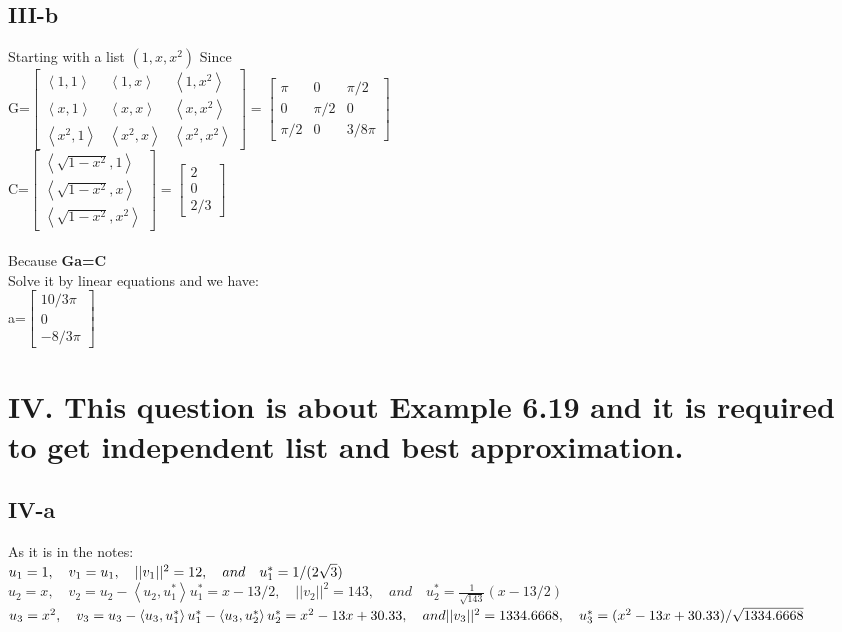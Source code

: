 \documentclass[twoside,a4paper]{article}
\begin{document}
\subsection*{III-b}
Starting with a list $(1,x,x^2)$
Since \\G=$
\begin{bmatrix}
\left< 1,1 \right> & \left< 1,x \right> &\left< 1,x^2 \right>\\
\left< x,1 \right> & \left< x,x \right> & \left< x,x^2 \right> \\
\left< x^2,1 \right> & \left<x^2,x \right> & \left<x^2,x^2 \right>
\end{bmatrix}
=
\begin{bmatrix}
\pi & 0&\pi/2\\
0 & \pi/2 & 0 \\
\pi/2 & 0 & 3/8 \pi
\end{bmatrix}$\\
C=$
\begin{bmatrix}
\left< \sqrt{1-x^2},1 \right> \\
\left< \sqrt{1-x^2},x \right> \\
\left< \sqrt{1-x^2},x^2 \right>
\end{bmatrix}
=
\begin{bmatrix}
2\\
0\\
2/3
\end{bmatrix}
$\\
\\
Because \textbf{Ga=C}\\
Solve it by linear equations and we have:\\
a=$
\begin{bmatrix}
10/3 \pi\\
0\\
-8/3 \pi
\end{bmatrix}
$

\section*{IV. This question is about Example 6.19 and it is required to get independent list and best approximation.}
\subsection*{IV-a}
As it is in the notes:\\
$ u_1=1, \quad v_1=u_1, \quad ||v_1||^2=12, \quad and \quad u^{*}_1=1/(2 \sqrt{3})\\$
$ u_2=x, \quad v_2=u_2- \left<u_2,u^{*}_1 \right> u^{*}_1=x-13/2, \quad ||v_2||^2=143, \quad and \quad u^{*}_2=\frac {1}{\sqrt{143}}(x-13/2)$\\
$u_3=x^2, \quad v_3=u_3-\left<u_3,u^{*}_1 \right> u^{*}_1-\left<u_3,u^{*}_2 \right> u^{*}_2=x^2-13x+30.33, \quad and ||v_3||^2=1334.6668, \quad u^{*}_3=(x^2-13x+30.33)/ \sqrt{1334.6668} \\$
\end{document}
